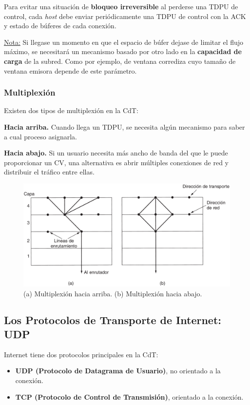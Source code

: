 \documentclass[10pt,a4paper]{article}
\begin{document}
Para evitar una situación de \textbf{bloqueo irreversible} al perderse una TDPU de control, cada \textit{host} debe enviar periódicamente una TDPU de control con la ACK y estado de búferes de cada conexión.

\underline{Nota:} Si llegase un momento en que el espacio de búfer dejase de limitar el flujo máximo, se necesitará un mecanismo basado por otro lado en la \textbf{capacidad de carga} de la subred. Como por ejemplo, de ventana corrediza cuyo tamaño de ventana emisora depende de este parámetro.

\subsubsection{Multiplexión}

Existen dos tipos de multiplexión en la CdT:
\begin{description}
\item \textbf{Hacia arriba.} Cuando llega un TDPU, se necesita algún mecanismo para saber a cual proceso asignarla.
\item \textbf{Hacia abajo.} Si un usuario necesita más ancho de banda del que le puede proporcionar un CV, una alternativa es abrir múltiples conexiones de red y distribuir el tráfico entre ellas.
\end{description}

\begin{figure}[ht!]
  \caption{(a) Multiplexión hacia arriba. (b) Multiplexión hacia abajo.}
  \label{fig:multiplexion}
  \centerline{\includegraphics[width=0.8\textwidth-\fboxrule-\fboxrule]{imgs/multiplexion.png}}
\end{figure}

\subsection{Los Protocolos de Transporte de Internet: UDP}

Internet tiene dos protocolos principales en la CdT:
\begin{itemize}
\item \textbf{UDP (Protocolo de Datagrama de Usuario)}, no orientado a la conexión.
\item \textbf{TCP (Protocolo de Control de Transmisión)}, orientado a la conexión.
\end{itemize}
\end{document}

